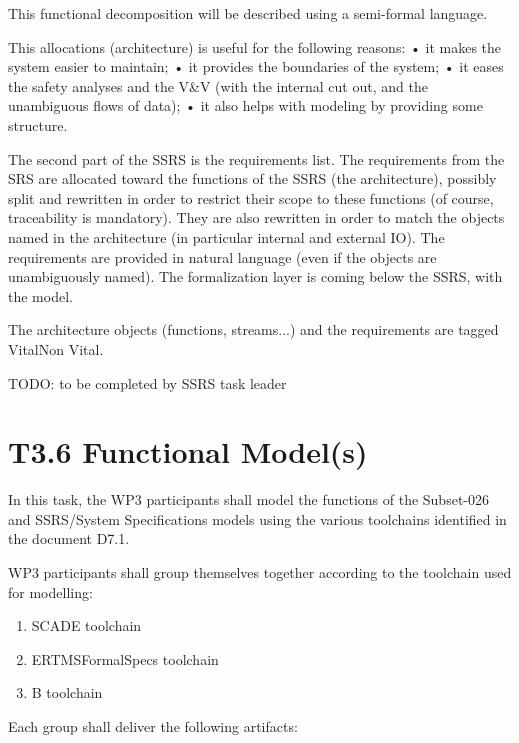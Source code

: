\documentclass{template/openetcs_article}
\begin{document}
This functional decomposition will be described using a semi-formal language.

This allocations (architecture) is useful for the following reasons:
•	it makes the system easier to maintain;
•	it provides the boundaries of the system;
•	it eases the safety analyses and the V\&V (with the internal cut out, and the unambiguous flows of data);
•	it also helps  with modeling by providing some structure.

The second part of the SSRS is the requirements list. The requirements from the SRS are allocated toward the functions of the SSRS (the architecture), possibly split and rewritten in order to restrict their scope to these functions (of course, traceability is mandatory). They are also rewritten in order to match the objects named in the architecture (in particular internal and external I\/O). The requirements are provided in natural language (even if the objects are unambiguously named). The formalization layer is coming below the SSRS, with the model.
 
The architecture objects (functions, streams...) and the requirements are tagged Vital\/Non Vital.

TODO: to be completed by SSRS task leader

\section{T3.6 Functional Model(s)}

In this task, the WP3 participants shall model the functions of the Subset-026 and SSRS/System Specifications models using the various toolchains 
identified in the document D7.1.


WP3 participants shall group themselves together according to the toolchain used for modelling:

\begin{enumerate}
	\item SCADE toolchain
	\item ERTMSFormalSpecs toolchain
	\item B toolchain
\end{enumerate}

Each group shall deliver the following artifacts:
\end{document}
